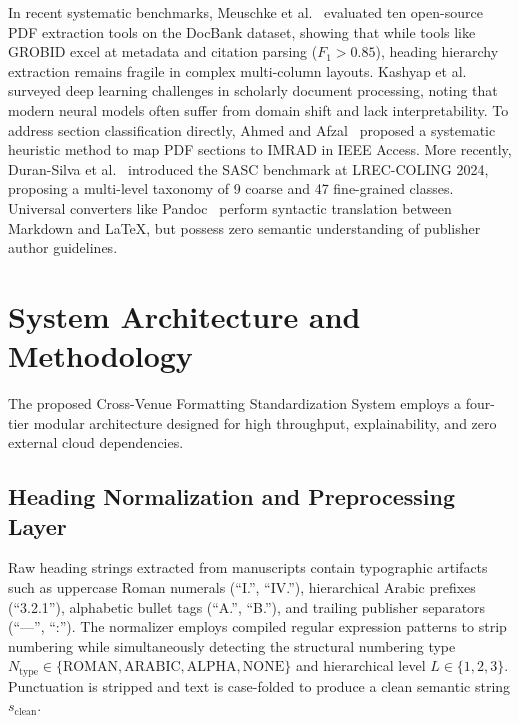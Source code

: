\documentclass[conference]{IEEEtran}
\begin{document}
In recent systematic benchmarks, Meuschke et al.~\cite{meuschke2023benchmark} evaluated ten open-source PDF extraction tools on the DocBank dataset, showing that while tools like GROBID excel at metadata and citation parsing ($F_1 > 0.85$), heading hierarchy extraction remains fragile in complex multi-column layouts. Kashyap et al.~\cite{kashyap2023scientific} surveyed deep learning challenges in scholarly document processing, noting that modern neural models often suffer from domain shift and lack interpretability. To address section classification directly, Ahmed and Afzal~\cite{ahmed2020systematic} proposed a systematic heuristic method to map PDF sections to IMRAD in IEEE Access. More recently, Duran-Silva et al.~\cite{duransilva2024sasc} introduced the SASC benchmark at LREC-COLING 2024, proposing a multi-level taxonomy of 9 coarse and 47 fine-grained classes. Universal converters like Pandoc~\cite{macfarlane2024pandoc} perform syntactic translation between Markdown and LaTeX, but possess zero semantic understanding of publisher author guidelines.

\section{System Architecture and Methodology}
The proposed Cross-Venue Formatting Standardization System employs a four-tier modular architecture designed for high throughput, explainability, and zero external cloud dependencies.

\subsection{Heading Normalization and Preprocessing Layer}
Raw heading strings extracted from manuscripts contain typographic artifacts such as uppercase Roman numerals (``I.'', ``IV.''), hierarchical Arabic prefixes (``3.2.1''), alphabetic bullet tags (``A.'', ``B.''), and trailing publisher separators (``---'', ``:''). The normalizer employs compiled regular expression patterns to strip numbering while simultaneously detecting the structural numbering type $N_{\text{type}} \in \{\text{ROMAN}, \text{ARABIC}, \text{ALPHA}, \text{NONE}\}$ and hierarchical level $L \in \{1, 2, 3\}$. Punctuation is stripped and text is case-folded to produce a clean semantic string $s_{\text{clean}}$.
\end{document}
